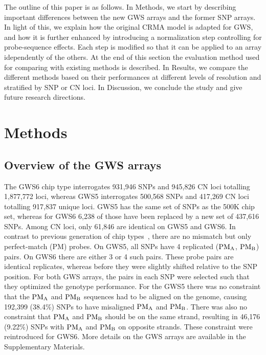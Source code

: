 \documentclass{bioinfo}
\newcommand{\GWS}{GWS\xspace}
\newcommand{\GWSFive}{GWS5\xspace}
\newcommand{\GWSSix}{GWS6\xspace}
\newcommand{\PMA}{\ensuremath{\textnormal{PM}_\textnormal{A}}\xspace}
\newcommand{\PMB}{\ensuremath{\textnormal{PM}_\textnormal{B}}\xspace}
\begin{document}
The outline of this paper is as follows. 
In Methods, we start by describing important differences between the new \GWS arrays and the former SNP arrays.  
In light of this, we explain how the original CRMA model is adapted for \GWS, and how it is further enhanced by introducing a normalization step controlling for probe-sequence effects.  
Each step is modified so that it can be applied to an array idependently of the others.
At the end of this section the evaluation method used for comparing with existing methods is described.
In Results, we compare the different methods based on their performances at different levels of resolution and stratified by SNP or CN loci.
In Discussion, we conclude the study and give future research directions.



\section{Methods}
\subsection{Overview of the \GWS arrays}

The \GWSSix chip type interrogates 931,946 SNPs and 945,826 CN loci totalling 1,877,772 loci, whereas \GWSFive interrogates 500,568 SNPs and 417,269 CN loci totalling 917,837 unique loci.  \GWSFive has the same set of SNPs as the 500K chip set, whereas for \GWSSix 6,238 of those have been replaced by a new set of 437,616 SNPs.  Among CN loci, only 61,846 are identical on \GWSFive and \GWSSix.
%
In contrast to previous generation of chip types~\citep{BengtssonH_etal_2008}, there are no  mismatch but only perfect-match (PM) probes.  
On \GWSFive, all SNPs have 4 replicated (\PMA, \PMB) pairs.  On \GWSSix there are either 3 or 4 such pairs. These probe pairs are identical replicates, whereas before they were slightly shifted relative to the SNP position.
%
For both \GWS arrays, the pairs in each SNP were selected such that they optimized the genotype performance.  For the \GWSFive there was no constraint that the \PMA and \PMB sequences had to be aligned on the genome, causing 192,399 (38.4\%) SNPs to have misaligned \PMA and \PMB.  There was also no constraint that \PMA and \PMB should be on the same strand, resulting in 46,176 (9.22\%) SNPs with \PMA and \PMB on opposite strands.  These constraint were reintroduced for \GWSSix.
More details on the \GWS arrays are available in the Supplementary Materials.
\end{document}
